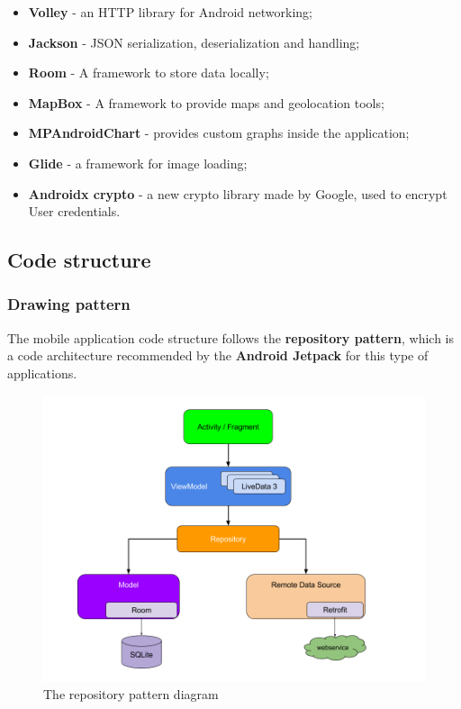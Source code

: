 \begin{itemize}
    \item \textbf{Volley} - an HTTP library for Android networking;
    \item \textbf{Jackson} - JSON serialization, deserialization and handling;
    \item \textbf{Room} - A framework to store data locally;
    \item \textbf{MapBox} - A framework to provide maps and geolocation tools;
    \item \textbf{MPAndroidChart} - provides custom graphs inside the application;
    \item \textbf{Glide} - a framework for image loading;
    \item \textbf{Androidx crypto} - a new crypto library made by Google, used to encrypt User credentials.
\end{itemize}

\subsection{Code structure}

\subsubsection{Drawing pattern}

The mobile application code structure follows the \textbf{repository pattern}, which is a code architecture recommended by the \textbf{Android Jetpack} for this type of applications.\\

\begin{figure}[H]
    \begin{center}
        \includegraphics[scale=0.5]{_figures/repository_pattern2.png}
        \caption{The repository pattern diagram}
    \end{center}
\end{figure}

